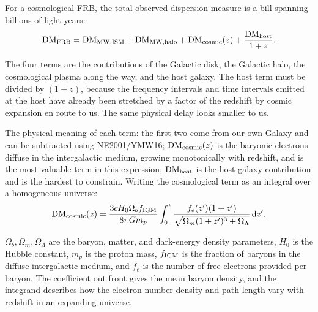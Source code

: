 For a cosmological FRB, the total observed dispersion measure is a bill spanning billions of light-years:
\begin{equation}
  {\rm DM}_{\rm FRB}
  =
  {\rm DM}_{\rm MW,ISM}
  +{\rm DM}_{\rm MW,halo}
  +{\rm DM}_{\rm cosmic}(z)
  +\frac{{\rm DM}_{\rm host}}{1+z} .
  \label{eq:e21-frb-dm-budget}
\end{equation}
\begin{formulaexplain}
The four terms are the contributions of the Galactic disk, the Galactic halo, the cosmological plasma along the way, and the host galaxy. The host term must be divided by \((1+z)\), because the frequency intervals and time intervals emitted at the host have already been stretched by a factor of the redshift by cosmic expansion en route to us. The same physical delay looks smaller to us.
\end{formulaexplain}
The physical meaning of each term: the first two come from our own Galaxy and can be subtracted using NE2001/YMW16; \({\rm DM}_{\rm cosmic}(z)\) is the baryonic electrons diffuse in the intergalactic medium, growing monotonically with redshift, and is the most valuable term in this expression; \({\rm DM}_{\rm host}\) is the host-galaxy contribution and is the hardest to constrain. Writing the cosmological term as an integral over a homogeneous universe:
\begin{equation}
  {\rm DM}_{\rm cosmic}(z)
  =
  \frac{3cH_0\Omega_b f_{\rm IGM}}{8\pi Gm_p}
  \int_0^z
  \frac{f_e(z')(1+z')}{\sqrt{\Omega_m(1+z')^3+\Omega_\Lambda}}
  \,{\rm d}z' .
  \label{eq:e21-cosmic-dm}
\end{equation}
\begin{formulaexplain}
\(\Omega_b,\Omega_m,\Omega_\Lambda\) are the baryon, matter, and dark-energy density parameters, \(H_0\) is the Hubble constant, \(m_p\) is the proton mass, \(f_{\rm IGM}\) is the fraction of baryons in the diffuse intergalactic medium, and \(f_e\) is the number of free electrons provided per baryon. The coefficient out front gives the mean baryon density, and the integrand describes how the electron number density and path length vary with redshift in an expanding universe.
\end{formulaexplain}
